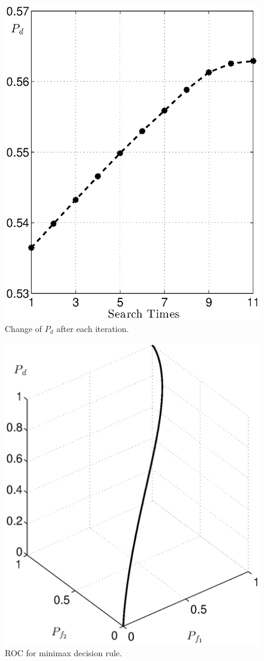 \documentclass[12pt,journal,a4paper,twoside,onecolumn]{IEEEtran}
\begin{document}
\begin{spacing}{2.5}
\begin{figure}[!t]
\centering
\includegraphics[width=12cm]{PDchange.eps}
\caption{Change of $P_d$ after each iteration.}
\label{pic: PDchange}
\end{figure}

\begin{figure}[!t]
\centering
\includegraphics[width=12cm]{mini.eps}
\caption{ROC for minimax decision rule.}
\label{pic: minimax}
\end{figure}

\end{spacing}
\end{document}
